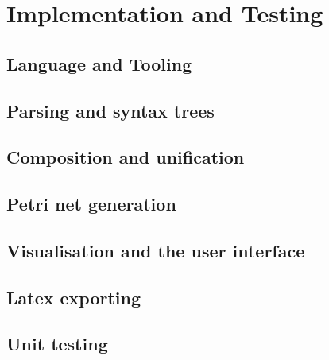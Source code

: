 \documentclass[../Dissertation.tex]{subfiles}
\begin{document}
\section{Implementation and Testing}
\subsection{Language and Tooling}
\subsection{Parsing and syntax trees}
\subsection{Composition and unification}
\subsection{Petri net generation}
\subsection{Visualisation and the user interface}
\subsection{Latex exporting}
\subsection{Unit testing}
\end{document}
